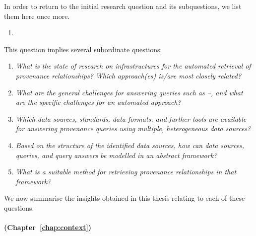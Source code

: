 In order to return to the initial research question and its subquestions,
we list them here once more.
\begin{mdframed}[
  linewidth=1pt,
  linecolor=black!50,
  innerleftmargin=0pt,innerrightmargin=0pt,
  leftline=false,rightline=false
]
  \begin{enumerate}
    \item[\RQ\phantom{\mybold{1}}]
  \end{enumerate}
\end{mdframed}
%
This question implies several subordinate questions:
%
\begin{mdframed}[
  linewidth=1pt,
  linecolor=black!50,
  innerleftmargin=0pt,innerrightmargin=0pt,
  leftline=false,rightline=false
]
  \begin{enumerate}
    \item[\subquestion{1}]
      \emph{What is the state of research on infrastructures for the automated retrieval
      of provenance relationships? Which approach(es) is/are most closely related?}
    \item[\subquestion{2}]
      \emph{What are the general challenges for answering queries such as --,
      and what are the specific challenges for an automated approach?}
    \item[\subquestion{3}]
      \emph{Which data sources, standards, data formats, and further tools
      are available for answering provenance queries using multiple, heterogeneous data sources?}
    \item[\subquestion{4}]
      \emph{Based on the structure of the identified data sources,
      how can data sources, queries, and query answers be modelled in an abstract framework?}
    \item[\subquestion{5}]
      \emph{What is a suitable method for retrieving provenance relationships
      in that framework?}
  \end{enumerate}
\end{mdframed}
%
We now summarise the insights obtained in this thesis relating to each of these questions.

\paragraph{\RQ[1] (Chapter~\ref{chap:context})}

